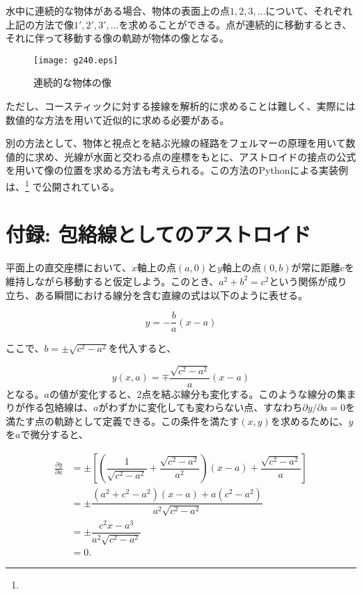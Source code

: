 \documentclass[twocolumn]{article}
\begin{document}
	水中に連続的な物体がある場合、物体の表面上の点$1, 2, 3, \dots$について、それぞれ上記の方法で像$1', 2', 3', \dots$を求めることができる。点が連続的に移動するとき、それに伴って移動する像の軌跡が物体の像となる。
	
	\begin{figure}[ht]
		\centering
		\texttt{[image: g240.eps]}
		\caption{連続的な物体の像}
		\label{fig:extended_image}
	\end{figure}
	
	ただし、コースティックに対する接線を解析的に求めることは難しく、実際には数値的な方法を用いて近似的に求める必要がある。
	
	別の方法として、物体と視点とを結ぶ光線の経路をフェルマーの原理を用いて数値的に求め、光線が水面と交わる点の座標をもとに、アストロイドの接点の公式を用いて像の位置を求める方法も考えられる。この方法のPythonによる実装例は、\href{https://github.com/mingshey/python_projects/blob/main/Refraction_Image.ipynb}%
	{}\footnote{} で公開されている。
	
	\appendix
	\newcommand{\pd}[2]{{\frac{\partial #1}{\partial #2}}}
	\newcommand{\ilpd}[2]{{{\partial #1}/{\partial #2}}}
	\section*{付録: 包絡線としてのアストロイド}
	
	平面上の直交座標において、$x$軸上の点$(a, 0)$と$y$軸上の点$(0, b)$が常に距離$c$を維持しながら移動すると仮定しよう。このとき、$a^2+b^2=c^2$という関係が成り立ち、ある瞬間における線分を含む直線の式は以下のように表せる。
	
	$$y=-\dfrac{b}{a}(x-a)$$
	
	ここで、$b=\pm \sqrt{c^2-a^2}$を代入すると、
	
	$$y(x, a) = \mp \dfrac{\sqrt{c^2-a^2}}{a}(x-a)$$
%	
	となる。$a$の値が変化すると、2点を結ぶ線分も変化する。このような線分の集まりが作る包絡線は、$a$がわずかに変化しても変わらない点、すなわち$\ilpd{y}{a} = 0$を満たす点の軌跡として定義できる。この条件を満たす$(x, y)$を求めるために、$y$を$a$で微分すると、
	
	$$ \begin{aligned}
		\pd{y}{a} &= \pm\left[\left( \dfrac{1}{\sqrt{c^2-a^2}}+\dfrac{\sqrt{c^2-a^2}}{a^2}\right) (x-a) + \dfrac{\sqrt{c^2-a^2}}{a} \right]\\
		&= \pm \dfrac{(a^2+c^2-a^2)(x-a)+a(c^2-a^2)}{a^2\sqrt{c^2-a^2}}\\
		&= \pm \dfrac{c^2 x - a^3}{a^2 \sqrt{c^2 - a^2}}\\
		&= 0.
	\end{aligned}
	$$
	
\end{document}
